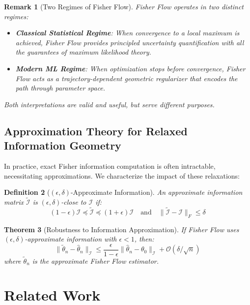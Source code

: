 \documentclass[11pt]{article}
\newtheorem{theorem}{Theorem}
\newtheorem{definition}[theorem]{Definition}
\newtheorem{remark}[theorem]{Remark}
\begin{document}
\begin{remark}[Two Regimes of Fisher Flow]
Fisher Flow operates in two distinct regimes:
\begin{itemize}
\item \textbf{Classical Statistical Regime}: When convergence to a local maximum is achieved, Fisher Flow provides principled uncertainty quantification with all the guarantees of maximum likelihood theory.
\item \textbf{Modern ML Regime}: When optimization stops before convergence, Fisher Flow acts as a trajectory-dependent geometric regularizer that encodes the path through parameter space.
\end{itemize}
Both interpretations are valid and useful, but serve different purposes.
\end{remark}

\subsection{Approximation Theory for Relaxed Information Geometry}

In practice, exact Fisher information computation is often intractable, necessitating approximations. We characterize the impact of these relaxations:

\begin{definition}[$(\epsilon, \delta)$-Approximate Information]
An approximate information matrix $\tilde{\mathcal{I}}$ is $(\epsilon, \delta)$-close to $\mathcal{I}$ if:
\begin{equation}
(1-\epsilon)\mathcal{I} \preceq \tilde{\mathcal{I}} \preceq (1+\epsilon)\mathcal{I} \quad \text{and} \quad \|\tilde{\mathcal{I}} - \mathcal{I}\|_F \leq \delta
\end{equation}
\end{definition}

\begin{theorem}[Robustness to Information Approximation]
\label{thm:approximation}
If Fisher Flow uses $(\epsilon, \delta)$-approximate information with $\epsilon < 1$, then:
\begin{equation}
\|\tilde{\theta}_n - \hat{\theta}_n\|_{\mathcal{I}} \leq \frac{\epsilon}{1-\epsilon}\|\hat{\theta}_n - \theta_0\|_{\mathcal{I}} + \mathcal{O}(\delta/\sqrt{n})
\end{equation}
where $\tilde{\theta}_n$ is the approximate Fisher Flow estimator.
\end{theorem}

\section{Related Work}
\end{document}

